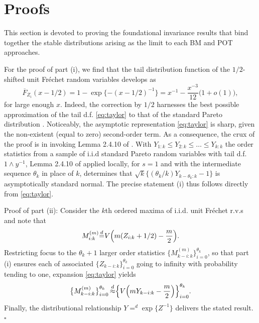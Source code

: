 \documentclass[11pt, a4paper, oneside]{article}
\numberwithin{equation}{section}
\theoremstyle{plain}
\theoremstyle{definition}
\newenvironment{pfofLem}{\noindent{\bf Proof of Lemma}}{\hfill $\square$ \\}
\newcommand{\id}{\ensuremath{\displaystyle{\mathop {=} ^d}}}
\begin{document}
\section{Proofs} \label{Sec:Proofs}

This section is devoted to proving the foundational invariance results that bind together the stable distributions arising as the limit to each BM and POT approaches.

\begin{pfofLem}{~\ref{Lem:UnitFrechetOS}:}
For the proof of part (i), we find that the tail distribution function of the $1/2$-shifted unit Fr\'echet random variables
develops as
\begin{equation}\label{eq:taylor}
	\overline{F}_{Z_i} (x-1/2) = 1 - \exp \{ - (x - 1/2)^{-1} \} = x^{-1} - \frac{x^{-3}}{12} \bigl( 1+ o(1)\bigr), 
\end{equation}
for large enough $x$. Indeed, the correction by $1/2$ harnesses the best possible approximation of the tail d.f. \eqref{eq:taylor} to that of the standard Pareto distribution \citep[cf.][]{Alzer1990}. Noticeably, the asymptotic representation \eqref{eq:taylor} is sharp, given the non-existent (equal to zero) second-order term. 
As a consequence, the crux of the proof is in invoking  Lemma 2.4.10 of \cite{deHaanFerreira2006}. 
With $Y_{1:k} \leq Y_{2:k} \leq \dots \leq Y_{k:k}$  the order statistics from a sample of i.i.d standard Pareto random variables with tail d.f.  $1 \wedge y^{-1}$, Lemma 2.4.10 of \cite{deHaanFerreira2006} applied locally, for $s=1$ and with  the intermediate sequence $\theta_k$ in place of $k$, determines that $\sqrt{k}\{(\theta_k/k)Y_{k - \theta_k:k} -1\} $ is asymptotically  standard normal. The precise statement (i) thus follows directly from \eqref{eq:taylor}.

\noindent Proof of part (ii):
Consider the $k$th ordered maxima of i.i.d. unit Fr\'echet  r.v.s and note that
\begin{equation*}
    M^{(m)}_{i:k} \id V\Bigl(m(Z_{i:k}+1/2)- \frac{m}{2} \Bigr).
\end{equation*}
Restricting focus to the $\theta_k +1$ larger order statistics $\bigl\{  M^{(m)}_{k-i:k}\bigr\}_{i=0}^{\theta_k}$, so that part (i) ensures each of associated  $\bigl\{  Z_{k-i:k}\bigr\}_{i=0}^{\theta_k}$ going to infinity with probability tending to one, expansion  \eqref{eq:taylor} yields
\begin{equation*}
   \bigl\{ M^{(m)}_{k-i:k}\bigr\}_{i=0}^{\theta_k} \mathop{\approx}^d \Bigl\{ V\Bigl(mY_{k-i:k}- \frac{m}{2} \Bigr) \Bigr\}_{i=0}^{\theta_k}.
\end{equation*}
 Finally, the  distributional relationship $Y \id \exp\{Z^{-1}\}$ delivers the stated result.
\end{pfofLem}
\end{document}
